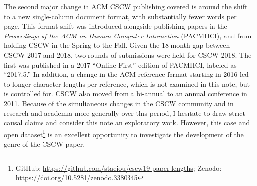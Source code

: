 \documentclass[format=acmsmall, screen=true]{acmart}
\begin{document}
The second major change in ACM CSCW publishing covered is around the shift to a new single-column document format, with substantially fewer words per page. This format shift was introduced alongside publishing papers in the \textit{Proceedings of the ACM on Human-Computer Interaction} (PACMHCI), and from holding CSCW in the Spring to the Fall. Given the 18 month gap between CSCW 2017 and 2018, two rounds of submissions were held for CSCW 2018. The first was published in a 2017 ``Online First'' edition of PACMHCI, labeled as ``2017.5.'' In addition, a change in the ACM reference format starting in 2016 led to longer character lengths per reference, which is not examined in this note, but is controlled for. CSCW also moved from a bi-annual to an annual conference in 2011. Because of the simultaneous changes in the CSCW community and in research and academia more generally over this period, I hesitate to draw strict causal claims and consider this note an exploratory work. However, this case and open dataset\footnote{ GitHub: \url{https://github.com/staeiou/cscw19-paper-lengths}; Zenodo: \url{https://doi.org/10.5281/zenodo.3380345}} is an excellent opportunity to investigate the development of the genre of the CSCW paper.
\end{document}
